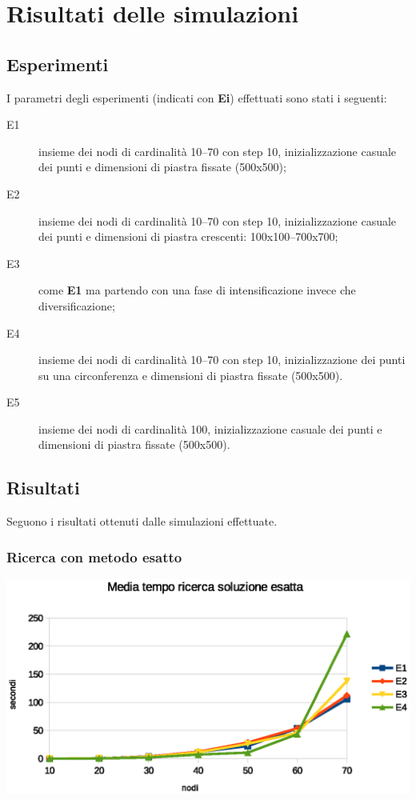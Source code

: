 \documentclass[a4paper]{article}
\begin{document}
    \section{Risultati delle simulazioni}
        
        \subsection{Esperimenti}
        I parametri degli esperimenti (indicati con \textbf{Ei}) effettuati sono stati i seguenti:
        \begin{description}
            \item[E1] insieme dei nodi di cardinalit\`a 10--70 con step 10, inizializzazione casuale dei punti e dimensioni di piastra fissate (500x500);
            \item[E2] insieme dei nodi di cardinalit\`a 10--70 con step 10, inizializzazione casuale dei punti e dimensioni di piastra crescenti: 100x100--700x700;
            \item[E3] come \textbf{E1} ma partendo con una fase di intensificazione invece che diversificazione;
            \item[E4] insieme dei nodi di cardinalit\`a 10--70 con step 10, inizializzazione dei punti su una circonferenza e dimensioni di piastra fissate (500x500).
            \item[E5] insieme dei nodi di cardinalit\`a 100, inizializzazione casuale dei punti e dimensioni di piastra fissate (500x500).
        \end{description}

        \subsection{Risultati}
            Seguono i risultati ottenuti dalle simulazioni effettuate.
            \subsubsection{Ricerca con metodo esatto}

                \includegraphics[scale=0.7]{img/exavgtime}
\end{document}

